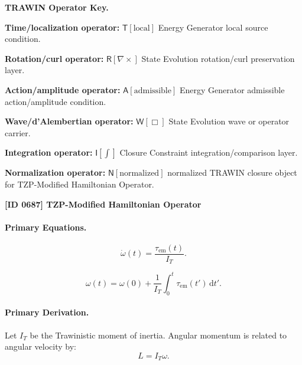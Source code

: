 \par\vspace{0.45\baselineskip}
\noindent\begin{minipage}[t]{\linewidth}
\begingroup
\small
\raggedright
\textbf{TRAWIN Operator Key.}\par
\noindent\textbf{Time/localization operator:} $\mathsf{T}\!\left[\mathrm{local}\right]$ Energy Generator local source condition.\par
\noindent\textbf{Rotation/curl operator:} $\mathsf{R}\!\left[\nabla\times\right]$ State Evolution rotation/curl preservation layer.\par
\noindent\textbf{Action/amplitude operator:} $\mathsf{A}\!\left[\mathrm{admissible}\right]$ Energy Generator admissible action/amplitude condition.\par
\noindent\textbf{Wave/d'Alembertian operator:} $\mathsf{W}\!\left[\Box\right]$ State Evolution wave or operator carrier.\par
\noindent\textbf{Integration operator:} $\mathsf{I}\!\left[\int\right]$ Closure Constraint integration/comparison layer.\par
\noindent\textbf{Normalization operator:} $\mathsf{N}\!\left[\mathrm{normalized}\right]$ normalized TRAWIN closure object for TZP-Modified Hamiltonian Operator.\par
\endgroup
\end{minipage}

\clearpage
\noindent\textbf{[ID 0687] TZP-Modified Hamiltonian Operator}\par
\vspace{0.35em}
\paragraph{Primary Equations.}
\begin{equation}
\dot{\omega}(t)
=
\frac{\tau_{\mathrm{em}}(t)}{I_T}.
\end{equation}

\begin{equation}
\omega(t)
=
\omega(0)
+
\frac{1}{I_T}
\int_0^t
\tau_{\mathrm{em}}(t')
\,\mathrm{d}t' .
\end{equation}

\paragraph{Primary Derivation.}
Let $I_T$ be the Trawinistic moment of inertia.  
Angular momentum is related to angular velocity by:
\begin{equation}
L=I_T\omega .
\end{equation}


